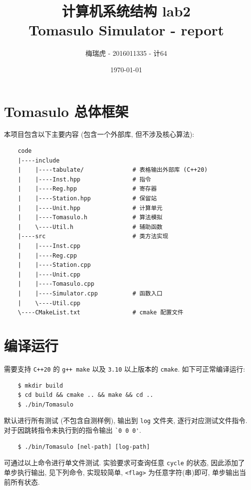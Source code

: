 \documentclass[12pt]{article}
\title{计算机系统结构 lab2\\ \large{Tomasulo Simulator - report}}
\author{梅瑞虎 - 2016011335 - 计64}
\date{\normalsize\today}
\begin{document}
\begin{CJK}{UTF8}{gbsn}

\maketitle

\section{Tomasulo 总体框架}

本项目包含以下主要内容 (包含一个外部库, 但不涉及核心算法):

\begin{verbatim}
    code
    |----include
    |    |----tabulate/              # 表格输出外部库 (C++20)
    |    |----Inst.hpp               # 指令
    |    |----Reg.hpp      	         # 寄存器
    |    |----Station.hpp            # 保留站
    |    |----Unit.hpp               # 计算单元
    |    |----Tomasulo.h             # 算法模拟
    |    \----Util.h                 # 辅助函数
    |----src                         # 类方法实现
    |    |----Inst.cpp
    |    |----Reg.cpp
    |    |----Station.cpp
    |    |----Unit.cpp
    |    |----Tomasulo.cpp
    |    |----Simulator.cpp          # 函数入口
    |    \----Util.cpp
    \----CMakeList.txt               # cmake 配置文件
\end{verbatim}

\section{编译运行}

需要支持 \verb|C++20| 的 \verb|g++ make| 以及 \verb|3.10| 以上版本的 \verb|cmake|. 如下可正常编译运行:

\begin{verbatim}
    $ mkdir build
    $ cd build && cmake .. && make && cd ..
    $ ./bin/Tomasulo
\end{verbatim}

默认进行所有测试 (不包含自测样例), 输出到 \verb|log| 文件夹, 逐行对应测试文件指令. 对于因跳转指令未执行到的指令输出 \verb|`0 0 0'|.

\begin{verbatim}
    $ ./bin/Tomasulo [nel-path] [log-path]
\end{verbatim}

可通过以上命令进行单文件测试. 实验要求可查询任意 \verb|cycle| 的状态, 因此添加了单步执行输出, 见下列命令, 实现较简单, \verb|<flag>| 为任意字符(串)即可, 单步输出当前所有状态.


\end{CJK}
\end{document}
